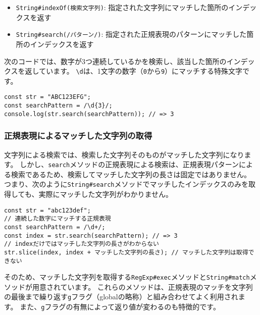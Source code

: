 \begin{itemize}
\item
  \texttt{String\#indexOf(検索文字列)}:
  指定された文字列にマッチした箇所のインデックスを返す
\item
  \texttt{String\#search(/パターン/)}:
  指定された正規表現のパターンにマッチした箇所のインデックスを返す
\end{itemize}

次のコードでは、数字が3つ連続しているかを検索し、該当した箇所のインデックスを返しています。
\texttt{\textbackslash d}は、1文字の数字（\texttt{0}から\texttt{9}）にマッチする特殊文字です。

\begin{lstlisting}
const str = "ABC123EFG";
const searchPattern = /\d{3}/;
console.log(str.search(searchPattern)); // => 3
\end{lstlisting}

\hypertarget{match-by-regexp}{%
\subsubsection{正規表現によるマッチした文字列の取得}\label{match-by-regexp}}

文字列による検索では、検索した文字列そのものがマッチした文字列になります。
しかし、\texttt{search}メソッドの正規表現による検索は、正規表現パターンによる検索であるため、検索してマッチした文字列の長さは固定ではありません。
つまり、次のように\texttt{String\#search}メソッドでマッチしたインデックスのみを取得しても、実際にマッチした文字列がわかりません。

\begin{lstlisting}
const str = "abc123def";
// 連続した数字にマッチする正規表現
const searchPattern = /\d+/;
const index = str.search(searchPattern); // => 3
// indexだけではマッチした文字列の長さがわからない
str.slice(index, index + マッチした文字列の長さ); // マッチした文字列は取得できない
\end{lstlisting}

そのため、マッチした文字列を取得する\texttt{RegExp\#exec}メソッドと\texttt{String\#match}メソッドが用意されています。
これらのメソッドは、正規表現のマッチを文字列の最後まで繰り返す\texttt{g}フラグ（globalの略称）と組み合わせてよく利用されます。
また、\texttt{g}フラグの有無によって返り値が変わるのも特徴的です。

